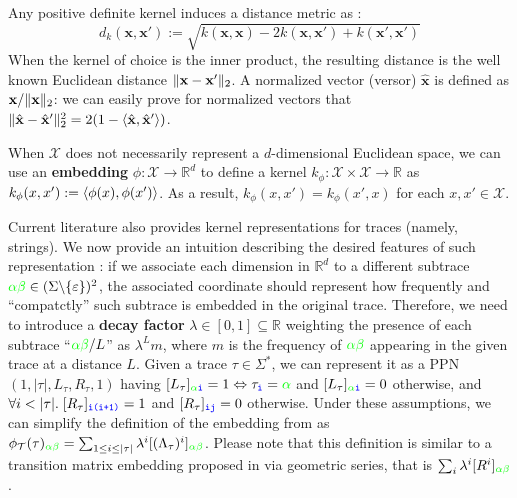 Any positive definite kernel induces a distance metric as \cite{Raedt}:
\[d_k(\mathbf{x},\mathbf{x}'):=\sqrt{k(\mathbf{x},\mathbf{x})-2k(\mathbf{x},\mathbf{x}')+k(\mathbf{x}',\mathbf{x}')}\] 
When the kernel of choice is the inner product, the resulting distance is the well known Euclidean distance $\|\mathbf{x}-\mathbf{x}'\|_{2}$. A normalized vector (versor) $\hat{\mathbf{x}}$ is defined as $\mathbf{x}/\|\mathbf{x}\|_{2}$: we can easily prove for normalized vectors that $\|\hat{\mathbf{x}}-\hat{\mathbf{x}}'\|_{2}^2=2(1-\Braket{\hat{\mathbf{x}},\hat{\mathbf{x}}'})$.

When $\mathcal{X}$ does not necessarily represent a $d$-dimensional Euclidean space, we can use an \textbf{embedding} $\phi\colon\mathcal{X}\to \mathbb{R}^d$ to define a kernel $k_\phi\colon \mathcal{X}\times \mathcal{X}\to\mathbb{R}$ as $k_\phi(x,x'):=\Braket{\phi(x),\phi(x')}$. As a result, $k_\phi(x,x')=k_\phi(x',x)$ for each $x,x'\in\mathcal{X}$.

Current literature also provides kernel representations for traces (namely, strings). We now provide an intuition describing the desired features of such representation \cite{LodhiSSCW02}: if we associate each dimension in $\mathbb{R}^d$ to a different subtrace ${\color{green}\alpha\beta}\in(\Sigma\backslash\{\varepsilon\})^2$, the associated coordinate should represent how frequently and ``compatctly'' such subtrace is embedded in the original trace. Therefore, we need to introduce a \textbf{decay factor} $\lambda\in[0,1]\subseteq\mathbb{R}$ weighting the presence of each subtrace ``${\color{green}\alpha\beta}/L$'' as $\lambda^Lm$, where $m$ is the frequency of $\color{green}\alpha\beta$ appearing in the given trace at a distance $L$. Given a trace $\tau\in\Sigma^*$, we can represent it as a PPN \cite{Myers1989} $(1,{|\tau|},L_\tau,R_\tau,1)$ having $[L_\tau]_{{\color{green}\alpha}\texttt{\color{blue}i}}=1\Leftrightarrow \tau_{\texttt{\color{blue}i}}={\color{green}\alpha}$ and $[L_\tau]_{{\color{green}\alpha}\texttt{\color{blue}i}}=0$ otherwise, and $\forall i<|\tau|.\; [R_\tau]_{\texttt{\color{blue}i(i+1)}}=1 $ and $[R_\tau]_{\texttt{\color{blue}ij}}=0$ otherwise. Under these assumptions, we can simplify the definition of the embedding from \cite{LodhiSSCW02,Raedt} as $\phi_{\mathcal{T}}(\tau)_{{\color{green}\alpha\beta}}=\sum_{1\leq i\leq |\tau|}\lambda^i[(\Lambda_\tau)^i]_{\color{green}\alpha\beta}$. Please note that this definition is similar to a transition matrix embedding proposed in \cite{GartnerFW03} via geometric series, that is $\sum_i\lambda^i[R^i]_{\color{green}\alpha\beta}$. 

